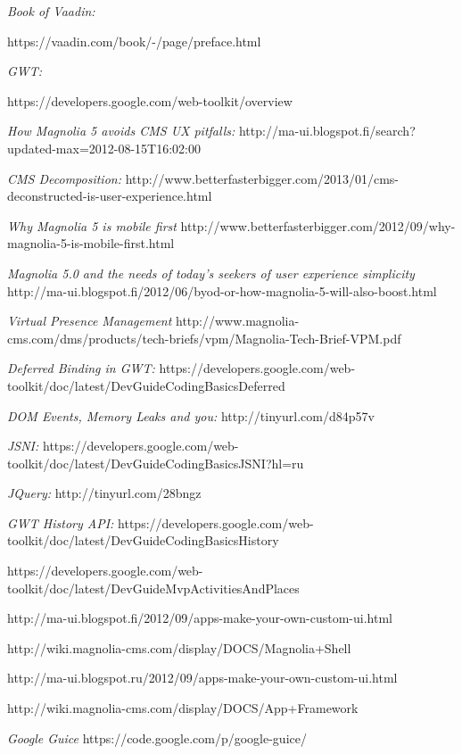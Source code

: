\begin{thebibliography}{9}
  \emph{Book of Vaadin:}
  
  https://vaadin.com/book/-/page/preface.html
  
  \emph{GWT:}
  
  https://developers.google.com/web-toolkit/overview
  
 \emph{How Magnolia 5 avoids CMS UX pitfalls:}
 http://ma-ui.blogspot.fi/search?updated-max=2012-08-15T16:02:00%
 
 \emph{CMS Decomposition:}
 http://www.betterfasterbigger.com/2013/01/cms-deconstructed-is-user-experience.html
 
 \emph{Why Magnolia 5 is mobile first}
 http://www.betterfasterbigger.com/2012/09/why-magnolia-5-is-mobile-first.html
 
 \emph{Magnolia 5.0 and the needs of today's seekers of user experience simplicity}
 http://ma-ui.blogspot.fi/2012/06/byod-or-how-magnolia-5-will-also-boost.html
 
 \emph{Virtual Presence Management}
 http://www.magnolia-cms.com/dms/products/tech-briefs/vpm/Magnolia-Tech-Brief-VPM.pdf
 
 \emph{Deferred Binding in GWT:}
 https://developers.google.com/web-toolkit/doc/latest/DevGuideCodingBasicsDeferred

 \emph{DOM Events, Memory Leaks and you:} 
 http://tinyurl.com/d84p57v 
  
\emph{JSNI:}
https://developers.google.com/web-toolkit/doc/latest/DevGuideCodingBasicsJSNI?hl=ru

\emph{JQuery:}
http://tinyurl.com/28bngz

\emph{GWT History API:}
https://developers.google.com/web-toolkit/doc/latest/DevGuideCodingBasicsHistory

https://developers.google.com/web-toolkit/doc/latest/DevGuideMvpActivitiesAndPlaces

http://ma-ui.blogspot.fi/2012/09/apps-make-your-own-custom-ui.html

http://wiki.magnolia-cms.com/display/DOCS/Magnolia+Shell

http://ma-ui.blogspot.ru/2012/09/apps-make-your-own-custom-ui.html

http://wiki.magnolia-cms.com/display/DOCS/App+Framework

\emph{Google Guice}
https://code.google.com/p/google-guice/
\end{thebibliography}